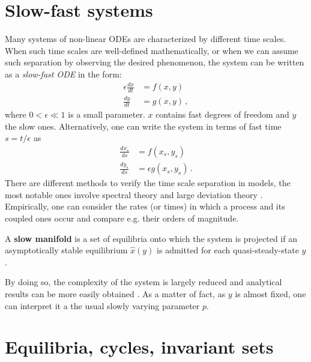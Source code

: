 \tocless\section{Slow-fast systems}
\label{sec:slowfast}
Many systems of non-linear \gls{ODE}s are characterized by different time scales. When such time scales are well-defined mathematically, or when we can assume such separation by observing the desired phenomenon, the system can be written as a \textit{slow-fast ODE} in the form:
\begin{align}
	\epsilon \frac{dx}{dt} & = f(x,y)\\
	\frac{dy}{dt} &= g(x,y) \, ,
	\label{eq:slowfast}
\end{align} 
where $0<\epsilon \ll 1$ is a small parameter. $x$ contains fast degrees of freedom and $y$ the slow ones. Alternatively, one can write the system in terms of fast time $s=t/\epsilon$ as
\begin{align}
	\frac{dx_s}{ds} & = f(x_s,y_s)\\
	\frac{dy_s}{ds} &= \epsilon g(x_s,y_s) \, .
\end{align} 
There are different methods to verify the time scale separation in models, the most notable ones involve spectral theory and large deviation theory \citep{Berglund2006}. Empirically, one can consider the rates (or times) in which a process and its coupled ones occur and compare e.g. their orders of magnitude.\\
\begin{definition}
	A \textbf{slow manifold} is a set of equilibria onto which the system is projected if an asymptotically stable equilibrium $\hat{x}(y)$ is admitted for each quasi-steady-state $y$.
	\label{def:slow_man}
\end{definition}
By doing so, the complexity of the system is largely reduced and analytical results can be more easily obtained \citep{strogatz2018nonlinear}. As a matter of fact, as $y$ is almost fixed, one can interpret it a the usual slowly varying parameter $p$. 




\tocless\section{Equilibria, cycles, invariant sets}
\label{sec:equlibria}

